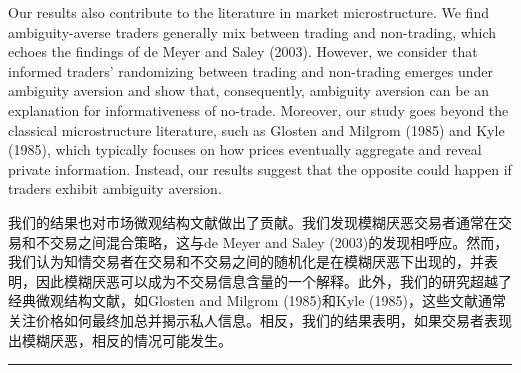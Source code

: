 \documentclass[12pt,a4paper]{article}
\newenvironment{original}{%
  \par\vspace{4pt}\noindent%
  \color{black}%
  \ignorespaces
}{%
  \par\vspace{2pt}%
}
\newenvironment{translation}{%
  \par\vspace{2pt}\noindent%
  \color{transblue}%
  \ignorespaces
}{%
  \par\vspace{4pt}\hrule\vspace{6pt}%
}
\begin{document}
\begin{original}
Our results also contribute to the literature in market microstructure. We find ambiguity-averse traders generally mix between trading and non-trading, which echoes the findings of de Meyer and Saley (2003). However, we consider that informed traders' randomizing between trading and non-trading emerges under ambiguity aversion and show that, consequently, ambiguity aversion can be an explanation for informativeness of no-trade. Moreover, our study goes beyond the classical microstructure literature, such as Glosten and Milgrom (1985) and Kyle (1985), which typically focuses on how prices eventually aggregate and reveal private information. Instead, our results suggest that the opposite could happen if traders exhibit ambiguity aversion.
\end{original}
\begin{translation}
我们的结果也对市场微观结构文献做出了贡献。我们发现模糊厌恶交易者通常在交易和不交易之间混合策略，这与de Meyer and Saley (2003)的发现相呼应。然而，我们认为知情交易者在交易和不交易之间的随机化是在模糊厌恶下出现的，并表明，因此模糊厌恶可以成为不交易信息含量的一个解释。此外，我们的研究超越了经典微观结构文献，如Glosten and Milgrom (1985)和Kyle (1985)，这些文献通常关注价格如何最终加总并揭示私人信息。相反，我们的结果表明，如果交易者表现出模糊厌恶，相反的情况可能发生。
\end{translation}
\end{document}

